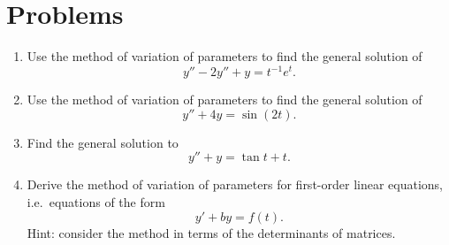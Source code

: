 \documentclass[10pt,driverfallback=hypertex]{report}
\begin{document}
\section{Problems}

\begin{enumerate}

\item Use the method of variation of parameters to find the general solution of
  \begin{dmath*}
  y'' - 2 y'' + y = t^{-1} e^t.
  \end{dmath*}

\item Use the method of variation of parameters to find the general solution of
  \begin{dmath*}
  y'' + 4y = \sin(2t).
  \end{dmath*}

\item
  Find the general solution to
  \begin{dmath*}
  y'' + y = \tan t + t.
  \end{dmath*}

\item
  Derive the method of variation of parameters for first-order linear
  equations, i.e.\ equations of the form
  \begin{dmath*}
  y' + by = f(t).
  \end{dmath*}
  Hint: consider the method in terms of the determinants of matrices.

\end{enumerate}
\end{document}
